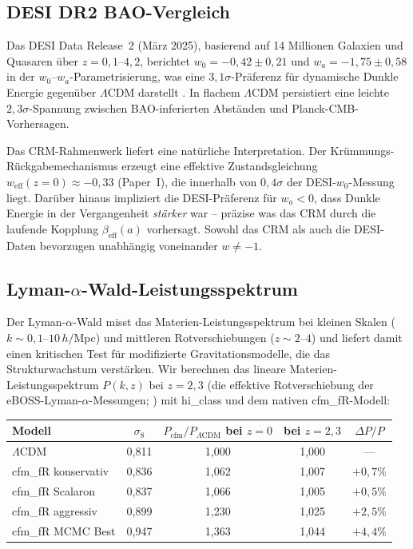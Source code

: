 \documentclass[11pt,a4paper]{article}
\begin{document}
\subsection{DESI DR2 BAO-Vergleich}
\label{subsec:desi}

Das DESI Data Release~2 (M\"arz 2025), basierend auf 14 Millionen Galaxien und Quasaren \"uber $z = 0{,}1$--$4{,}2$, berichtet $w_0 = -0{,}42 \pm 0{,}21$ und $w_a = -1{,}75 \pm 0{,}58$ in der $w_0$--$w_a$-Parametrisierung, was eine $3{,}1\sigma$-Pr\"aferenz f\"ur dynamische Dunkle Energie gegen\"uber $\Lambda$CDM darstellt \cite{DESI2025}. In flachem $\Lambda$CDM persistiert eine leichte $2{,}3\sigma$-Spannung zwischen BAO-inferierten Abst\"anden und Planck-CMB-Vorhersagen.

Das CRM-Rahmenwerk liefert eine nat\"urliche Interpretation. Der Kr\"ummungs-R\"uckgabemechanismus erzeugt eine effektive Zustandsgleichung $w_{\mathrm{eff}}(z=0) \approx -0{,}33$ (Paper~I), die innerhalb von $0{,}4\sigma$ der DESI-$w_0$-Messung liegt. Dar\"uber hinaus impliziert die DESI-Pr\"aferenz f\"ur $w_a < 0$, dass Dunkle Energie in der Vergangenheit \textit{st\"arker} war -- pr\"azise was das CRM durch die laufende Kopplung $\beta_{\mathrm{eff}}(a)$ vorhersagt. Sowohl das CRM als auch die DESI-Daten bevorzugen unabh\"angig voneinander $w \neq -1$.

\subsection{Lyman-$\alpha$-Wald-Leistungsspektrum}
\label{subsec:lyman_alpha}

Der Lyman-$\alpha$-Wald misst das Materien-Leistungsspektrum bei kleinen Skalen ($k \sim 0{,}1$--$10\,h/$Mpc) und mittleren Rotverschiebungen ($z \sim 2$--$4$) und liefert damit einen kritischen Test f\"ur modifizierte Gravitationsmodelle, die das Strukturwachstum verst\"arken. Wir berechnen das lineare Materien-Leistungsspektrum $P(k,z)$ bei $z = 2{,}3$ (die effektive Rotverschiebung der eBOSS-Lyman-$\alpha$-Messungen; \cite{Chabanier2019}) mit hi\_class und dem nativen cfm\_fR-Modell:

\begin{center}
\begin{tabular}{lcccc}
\toprule
\textbf{Modell} & $\sigma_8$ & $P_{\mathrm{cfm}}/P_{\Lambda\mathrm{CDM}}$ bei $z=0$ & bei $z=2{,}3$ & $\Delta P/P$ \\
\midrule
$\Lambda$CDM & 0{,}811 & 1{,}000 & 1{,}000 & --- \\
cfm\_fR konservativ & 0{,}836 & 1{,}062 & 1{,}007 & $+0{,}7\%$ \\
cfm\_fR Scalaron & 0{,}837 & 1{,}066 & 1{,}005 & $+0{,}5\%$ \\
cfm\_fR aggressiv & 0{,}899 & 1{,}230 & 1{,}025 & $+2{,}5\%$ \\
cfm\_fR MCMC Best & 0{,}947 & 1{,}363 & 1{,}044 & $+4{,}4\%$ \\
\bottomrule
\end{tabular}
\end{center}
\end{document}
